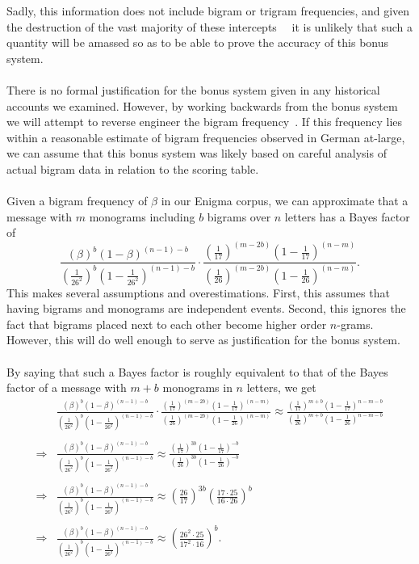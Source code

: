 Sadly, this information does not include bigram or trigram
frequencies, and given the destruction of the vast majority of
these intercepts~\cite[p.~29]{deutsch2006ultra}~\cite[p.~193]{sullivan-weierud} it
is unlikely that such a quantity will be amassed so as to be able
to prove the accuracy of this bonus system.
\\\\There is no formal justification for the bonus system given in any historical accounts we examined. However, by working backwards from the bonus system we will attempt
to reverse engineer the bigram frequency~\cite{cryptoSEBanburismus}. If this frequency lies
within a reasonable estimate of bigram frequencies observed in
German at-large, we can assume that this bonus system was likely
based on careful analysis of actual bigram data in relation to the
scoring table.
\\\\Given a bigram frequency of $\beta$ in our Enigma corpus, we
can approximate that a message with $m$ monograms including $b$
bigrams over $n$ letters has a Bayes factor of
\[
  \frac{(\beta)^b(1-\beta)^{(n-1)-b}}{(\frac{1}{26^2})^b(1-\frac{1}{26^2})^{(n-1)-b}}\cdot\frac{(\frac{1}{17})^{(m-2b)}(1-\frac{1}{17})^{(n-m)}}{(\frac{1}{26})^{(m-2b)}(1-\frac{1}{26})^{(n-m)}}.
\]
This makes several assumptions and overestimations. First, this
assumes that having bigrams and monograms are independent events.
Second, this ignores the fact that bigrams placed next to each
other become higher order $n$-grams. However, this will do well
enough to serve as justification for the bonus system.
\\\\By saying that such a Bayes factor is roughly equivalent to
that of the Bayes factor of a message with $m+b$ monograms in $n$
letters, we get
\begin{align*}
  &
  \frac{(\beta)^b(1-\beta)^{(n-1)-b}}{(\frac{1}{26^2})^b(1-\frac{1}{26^2})^{(n-1)-b}}\cdot\frac{(\frac{1}{17})^{(m-2b)}(1-\frac{1}{17})^{(n-m)}}{(\frac{1}{26})^{(m-2b)}(1-\frac{1}{26})^{(n-m)}}
  \approx
  \frac{(\frac{1}{17})^{m+b}(1-\frac{1}{17})^{n-m-b}}{(\frac{1}{26})^{m+b}(1-\frac{1}{26})^{n-m-b}}
  \\\\
  \Rightarrow &
  \frac{(\beta)^b(1-\beta)^{(n-1)-b}}{(\frac{1}{26^2})^b(1-\frac{1}{26^2})^{(n-1)-b}}\approx
  \frac{(\frac{1}{17})^{3b}(1-\frac{1}{17})^{-b}}{(\frac{1}{26})^{3b}(1-\frac{1}{26})^{-b}}
  \\\\
  \Rightarrow &
  \frac{(\beta)^b(1-\beta)^{(n-1)-b}}{(\frac{1}{26^2})^b(1-\frac{1}{26^2})^{(n-1)-b}}\approx
  (\frac{26}{17})^{3b}(\frac{17\cdot25}{16\cdot26})^b
  \\\\
  \Rightarrow &
  \frac{(\beta)^b(1-\beta)^{(n-1)-b}}{(\frac{1}{26^2})^b(1-\frac{1}{26^2})^{(n-1)-b}}\approx
  (\frac{26^2\cdot25}{17^2\cdot16})^b.
\end{align*}
